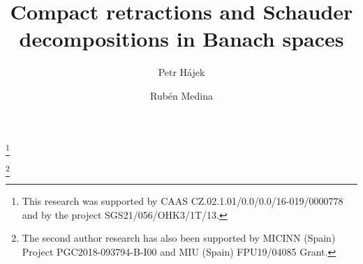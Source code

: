 \documentclass[11pt]{amsart}
\newcommand{\<}{\langle}
\renewcommand{\>}{\rangle}
\theoremstyle{definition}
\theoremstyle{remark}
\numberwithin{equation}{section}
\begin{document}


\title[Compact retracts]{Compact retractions and Schauder decompositions in Banach spaces}

\author{Petr H\'ajek}\thanks{This research was supported by CAAS CZ.02.1.01/0.0/0.0/16-019/0000778
 and by the project  SGS21/056/OHK3/1T/13.}
\address[P. H\'ajek]{Czech Technical University in Prague, Faculty of Electrical Engineering.
Department of Mathematics, Technická 2, 166 27 Praha 6 (Czech Republic)}


\author{ Rub\'en Medina}\thanks{The second author research has also been supported by MICINN (Spain) Project PGC2018-093794-B-I00 and MIU (Spain) FPU19/04085 Grant.}
\address[R. Medina]{Universidad de Granada, Facultad de Ciencias.
Departamento de An\'{a}lisis Matem\'{a}tico, 18071-Granada
(Spain); and Czech technical University in Prague, Faculty of Electrical Engineering.
Department of Mathematics, Technická 2, 166 27 Praha 6 (Czech Republic)}

\maketitle 
\end{document}
